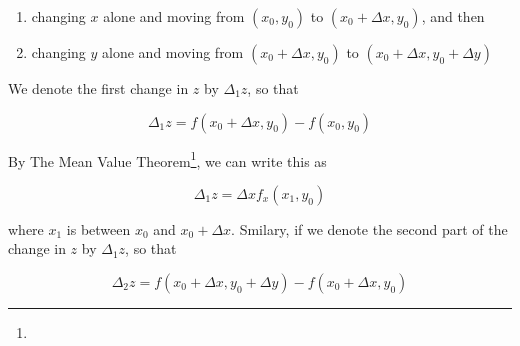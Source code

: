\begin{enumerate}
    \item changing $x$ alone and moving from $(x_0, y_0)$ to $(x_0 + \Delta x, y_0)$, and then
    \item changing $y$ alone and moving from $(x_0 + \Delta x, y_0)$ to $(x_0 + \Delta x, y_0 + \Delta y)$
\end{enumerate}

We denote the first change in $z$ by $\Delta_1 z$, so that

\begin{equation}
    \Delta_1 z = f(x_0 + \Delta x, y_0) - f(x_0, y_0)
\end{equation}

By The Mean Value Theorem\footnote{
}, we can write this as

\begin{equation}\label{eq:first-change-z-mean-val-theo}
\Delta_1 z = \Delta x f_x(x_1, y_0)
\end{equation}

where $x_1$ is between $x_0$ and $x_0 + \Delta x$. Smilary, if we denote the second part of the change in $z$ by
$\Delta_1 z$, so that

\begin{equation}
    \Delta_2 z = f(x_0 + \Delta x, y_0 + \Delta y) - f(x_0 + \Delta x, y_0)
\end{equation}

